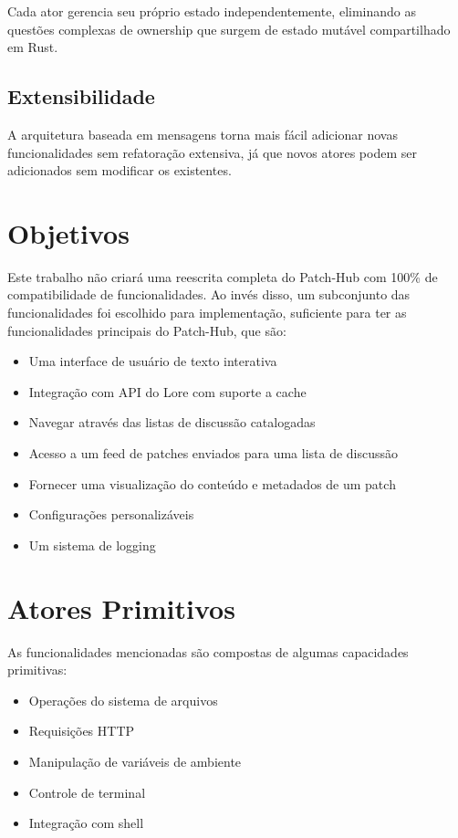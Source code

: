 Cada ator gerencia seu próprio estado independentemente, eliminando as questões complexas de ownership que surgem de estado mutável compartilhado em Rust.

\subsection{Extensibilidade}

A arquitetura baseada em mensagens torna mais fácil adicionar novas funcionalidades sem refatoração extensiva, já que novos atores podem ser adicionados sem modificar os existentes.

\section{Objetivos}

Este trabalho não criará uma reescrita completa do Patch-Hub com 100\% de compatibilidade de funcionalidades. Ao invés disso, um subconjunto das funcionalidades foi escolhido para implementação, suficiente para ter as funcionalidades principais do Patch-Hub, que são:

\begin{itemize}
    \item Uma interface de usuário de texto interativa
    \item Integração com API do Lore com suporte a cache
    \item Navegar através das listas de discussão catalogadas
    \item Acesso a um feed de patches enviados para uma lista de discussão
    \item Fornecer uma visualização do conteúdo e metadados de um patch
    \item Configurações personalizáveis
    \item Um sistema de logging
\end{itemize}

\section{Atores Primitivos}

As funcionalidades mencionadas são compostas de algumas capacidades primitivas:

\begin{itemize}
    \item Operações do sistema de arquivos
    \item Requisições HTTP
    \item Manipulação de variáveis de ambiente
    \item Controle de terminal
    \item Integração com shell
\end{itemize}

